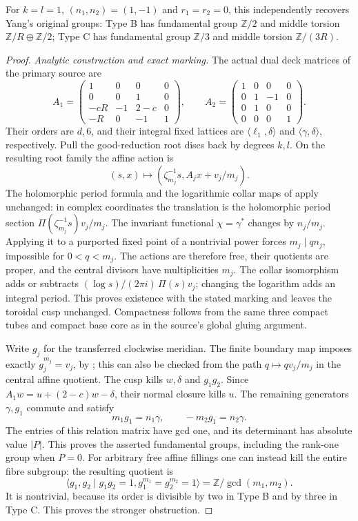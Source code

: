 For $k=l=1$, $(n_1,n_2)=(1,-1)$ and $r_1=r_2=0$, this independently
recovers Yang's original groups: Type B has fundamental group
$\mathbb Z/2$ and middle torsion $\mathbb Z/R\oplus\mathbb Z/2$;
Type C has fundamental group $\mathbb Z/3$ and middle torsion
$\mathbb Z/(3R)$.
\begin{proof}
\emph{Analytic construction and exact marking.}
The actual dual deck matrices of the primary source are
\[
 A_1=\begin{pmatrix}
 1&0&0&0\\0&0&1&0\\-cR&-1&2-c&0\\-R&0&-1&1
 \end{pmatrix},\qquad
 A_2=\begin{pmatrix}
 1&0&0&0\\0&1&-1&0\\0&1&0&0\\0&0&0&1
 \end{pmatrix}.
\]
Their orders are $d,6$, and their integral fixed lattices are
$\langle\ell_1,\delta\rangle$ and
$\langle\gamma,\delta\rangle$, respectively.
Pull the good-reduction root discs back by degrees $k,l$.
On the resulting root family the affine action is
\[
 (s,x)\longmapsto(\zeta_{m_j}^{-1}s,A_jx+v_j/m_j).
\]
The holomorphic period formula and the logarithmic collar maps of
\cite[Lemma 4.1, Lemma 4.3]{manYang26} apply unchanged: in complex
coordinates the translation is the holomorphic period section
$\Pi(\zeta_{m_j}^{-1}s)v_j/m_j$.
The invariant functional $\chi=\gamma^*$ changes by $n_j/m_j$.
Applying it to a purported fixed point of a nontrivial power
forces $m_j\mid qn_j$, impossible for $0<q<m_j$.
The actions are therefore free, their quotients are proper, and
the central divisors have multiplicities $m_j$.
The collar isomorphism adds or subtracts
$(\log s)/(2\pi i)\,\Pi(s)v_j$; changing the logarithm adds an
integral period. This proves existence with the stated marking
and leaves the toroidal cusp unchanged. Compactness follows from
the same three compact tubes and compact base core as in the
source's global gluing argument.

Write $g_j$ for the transferred clockwise meridian. The finite
boundary map imposes exactly $g_j^{m_j}=v_j$, by
\cite[Proposition 4.4]{manYang26}; this can also be checked from
the path $q\mapsto qv_j/m_j$ in the central affine quotient.
The cusp kills $w,\delta$ and $g_1g_2$.
Since $A_1w=u+(2-c)w-\delta$, their normal closure kills $u$.
The remaining generators $\gamma,g_1$ commute and satisfy
\[
 m_1g_1=n_1\gamma,\qquad -m_2g_1=n_2\gamma.
\]
The entries of this relation matrix have gcd one, and its
determinant has absolute value $|P|$. This proves the asserted
fundamental groups, including the rank-one group when $P=0$.
For arbitrary free affine fillings one can instead kill the
entire fibre subgroup: the resulting quotient is
\[
 \langle g_1,g_2\mid g_1g_2=1,
                  g_1^{m_1}=g_2^{m_2}=1\rangle
 =\mathbb Z/\gcd(m_1,m_2).
\]
It is nontrivial, because its order is divisible by two in Type B
and by three in Type C. This proves the stronger obstruction.


\end{proof}
